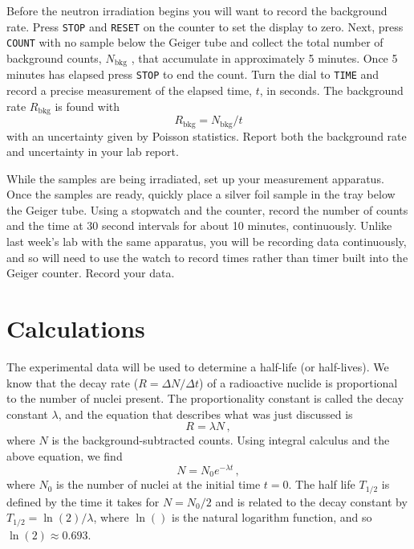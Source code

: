 Before the neutron irradiation begins you will want to record the background rate. Press
\texttt{STOP} and \texttt{RESET} on the counter to set the display to zero. Next, press \texttt{COUNT} with no
sample below the Geiger tube and collect the total number of background counts, $N_\textrm{bkg}$ ,
that accumulate in approximately 5 minutes. Once 5 minutes has elapsed press \texttt{STOP} to
end the count. Turn the dial to \texttt{TIME} and record a precise measurement of the elapsed
time, $t$, in seconds. The background rate $R_\textrm{bkg}$ is found with
\begin{equation}
R_\textrm{bkg} = N_\textrm{bkg} /t
\end{equation}
with an uncertainty given by Poisson statistics. Report both the background rate and uncertainty in your lab report.

While the samples are being irradiated, set up your measurement apparatus. Once the samples are ready, quickly place a silver foil sample in the tray below the Geiger tube. Using a stopwatch and the
counter, record the number of counts and the time at 30 second intervals for
about 10 minutes, continuously. Unlike last week's lab with the same apparatus, you will
be recording data continuously, and so will need to use the watch to record times rather
than timer built into the Geiger counter. Record your data.

\section{Calculations}

The experimental data will be used to determine a half-life (or half-lives). We know that
the decay rate ($R=\Delta N / \Delta t$) of a radioactive nuclide is proportional to the number of nuclei present. The proportionality constant is called the decay constant $\lambda$, and the equation that describes what was just discussed is
\begin{equation}
 R = \lambda N \,,
\end{equation}
where $N$ is the background-subtracted counts. Using integral calculus and the above equation, we find
\begin{equation}
 N = N_0 e^{-\lambda t} \,,
\end{equation}
where $N_0$ is the number of nuclei at the initial time $t=0$. The half life $T_{1/2}$ is defined by
the time it takes for $N = N_0 /2$ and is related to the decay constant by $T_{1/2} = \ln(2)/ \lambda$, where
$\ln()$ is the natural logarithm function, and so $\ln(2) \approx 0.693$.

